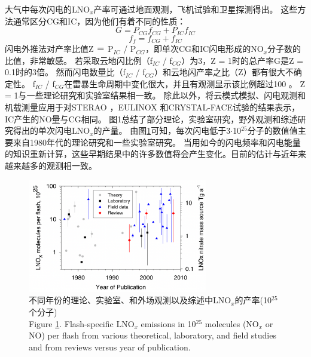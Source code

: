 大气中每次闪电的LNO$_x$产率可通过地面观测\citep{Noxon.1976}，飞机试验\citep{Chameides.1987}和卫星探测\citep{Beirle.2004}得出。
这些方法通常区分CG和IC，因为他们有着不同的性质：
\begin{equation}
G = P\textrm{$_{CG}$}f\textrm{$_{CG}$}  + P\textrm{$_{IC}$}f\textrm{$_{IC}$}
\end{equation}
\begin{equation}
f\textrm{$_{f}$}  = f\textrm{$_{CG}$}  + f\textrm{$_{IC}$}
\end{equation}
闪电外推法对产率比值Z ＝ P\textrm{$_{IC}$} / P\textrm{$_{CG}$}，即单次CG和IC闪电形成的NO$_x$分子数的比值，非常敏感\citep{Bond.2002}。
若采取云地闪比例（f\textrm{$_{IC}$} / f\textrm{$_{CG}$}）为3，Z = 1时的总产率G是Z = 0.1时的3倍\citep{Gallardo.1996,Ridley.2004,Ridley.2005}。
然而闪电数量比（f\textrm{$_{IC}$} / f\textrm{$_{CG}$}）和云地闪产率之比（Z）都有很大不确定性。
f\textrm{$_{IC}$} / f\textrm{$_{CG}$}在雷暴生命周期中变化很大，并且有观测显示该比例超过100 \citep{Dye.2000,DeCaria.2005,Ott.2007}。
Z = 1与一些理论研究\citep{Cooray.1997}和实验室结果\citep{Cooray.2005}相一致。
除此以外，将云模式模拟、闪电观测和机载测量应用于对STERAO \citep{DeCaria.2000}，EULINOX \citep{Fehr.2004}和CRYSTAL-FACE试验的结果表示，IC产生的NO量与CG相同。
图1总结了部分理论，实验室研究，野外观测和综述研究得出的单次闪电LNO$_x$的产量。
由图\ref{figure:lnox_production_Schumann}可知，每次闪电低于3$\cdot$10$^{25}$分子的数值值主要来自1980年代的理论研究和一些实验室研究。
当用如今的闪电频率和闪电能量的知识重新计算，这些早期结果中的许多数值将会产生变化。目前的估计与近年来越来越多的观测相一致。


\begin{figure}[htbp]
\centering
\includegraphics[width=0.7\textwidth]{./figures/lnox_production_Schumann.png}
\caption{不同年份的理论、实验室、和外场观测以及综述中LNO$_x$的产率(10$^{25}$个分子)\\
Figure \ref{figure:lnox_production_Schumann}.
Flash-specific LNO$_x$ emissions in 10$^{25}$ molecules (NO$_x$ or NO) per flash from various theoretical, laboratory, and field studies and from reviews versus year of publication.
}
\label{figure:lnox_production_Schumann}
\end{figure}


